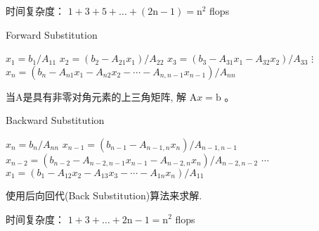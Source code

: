 时间复杂度： $ 1+3+5+\ldots+(2 \mathrm{n}-1)=\mathrm{n}^{2} $ flops

\begin{algorithm}[htbp]
    \caption{Forward Substitution}
    $ x_{1}=b_{1} / A_{11} $\;
$ x_{2}=\left(b_{2}-A_{21} x_{1}\right) / A_{22} $\;
$  x_{3} =\left(b_{3}-A_{31} x_{1}-A_{32} x_{2}\right) / A_{33} $ \;
    $\vdots$  \;
    $x_{n} =\left(b_{n}-A_{n 1} x_{1}-A_{n 2} x_{2}-\cdots-A_{n, n-1} x_{n-1}\right) / A_{n n} $\;
\end{algorithm}

\begin{problem}
    当A是具有非零对角元素的上三角矩阵, 解 $ \mathrm{A} x=\mathrm{b} $ 。
\end{problem}

\begin{algorithm}[htbp]
    \caption{Backward Substitution}

    $ x_{n}=b_{n} / A_{n n} $\;
    $ x_{n-1}=\left(b_{n-1}-A_{n-1, n} x_{n}\right) / A_{n-1, n-1} $ \;
    $ x_{n-2}=\left(b_{n-2}-A_{n-2, n-1} x_{n-1}-A_{n-2, n} x_{n}\right) / A_{n-2, n-2} $\;
    $\cdots$\;
    $ x_{1}=\left(b_{1}-A_{12} x_{2}-A_{13} x_{3}-\cdots-A_{1 n} x_{n}\right) / A_{11} $\;
\end{algorithm}

使用后向回代(Back Substitution)算法来求解.

时间复杂度： $ 1+3+\ldots+2 \mathrm{n}-1=\mathrm{n}^{2} $ flops